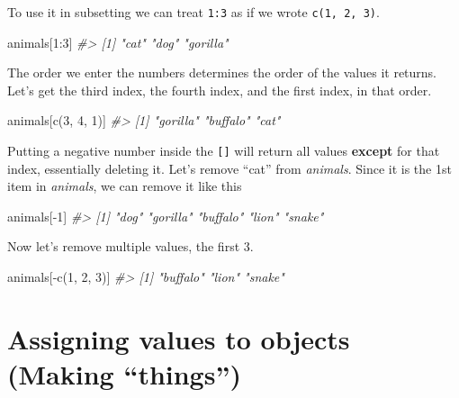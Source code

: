 \documentclass[
]{krantz}
\makeatletter
\newenvironment{Shaded}{\begin{snugshade}}{\end{snugshade}}
\newcommand{\CommentTok}[1]{\textcolor[rgb]{0.37,0.37,0.37}{\textit{#1}}}
\newcommand{\DecValTok}[1]{\textcolor[rgb]{0.06,0.06,0.06}{#1}}
\newcommand{\FunctionTok}[1]{\textcolor[rgb]{0,0,0}{#1}}
\newcommand{\NormalTok}[1]{#1}
\newcommand{\SpecialCharTok}[1]{\textcolor[rgb]{0,0,0}{#1}}
\newenvironment{kframe}{%
\medskip{}
\setlength{\fboxsep}{.8em}
 \def\at@end@of@kframe{}%
 \ifinner\ifhmode%
  \def\at@end@of@kframe{\end{minipage}}%
  \begin{minipage}{\columnwidth}%
 \fi\fi%
 \def\FrameCommand##1{\hskip\@totalleftmargin \hskip-\fboxsep
 \colorbox{shadecolor}{##1}\hskip-\fboxsep
     \hskip-\linewidth \hskip-\@totalleftmargin \hskip\columnwidth}%
 \MakeFramed {\advance\hsize-\width
   \@totalleftmargin\z@ \linewidth\hsize
   \@setminipage}}%
 {\par\unskip\endMakeFramed%
 \at@end@of@kframe}
\renewenvironment{Shaded}{\begin{kframe}}{\end{kframe}}
\makeatother
\begin{document}
To use it in subsetting we can treat \texttt{1:3} as if we wrote \texttt{c(1,\ 2,\ 3)}.

\begin{Shaded}
\begin{Highlighting}[]
\NormalTok{animals[}\DecValTok{1}\SpecialCharTok{:}\DecValTok{3}\NormalTok{]}
\CommentTok{\#\textgreater{} [1] "cat"     "dog"     "gorilla"}
\end{Highlighting}
\end{Shaded}

The order we enter the numbers determines the order of the values it returns. Let's get the third index, the fourth index, and the first index, in that order.

\begin{Shaded}
\begin{Highlighting}[]
\NormalTok{animals[}\FunctionTok{c}\NormalTok{(}\DecValTok{3}\NormalTok{, }\DecValTok{4}\NormalTok{, }\DecValTok{1}\NormalTok{)]}
\CommentTok{\#\textgreater{} [1] "gorilla" "buffalo" "cat"}
\end{Highlighting}
\end{Shaded}

Putting a negative number inside the \texttt{{[}{]}} will return all values \textbf{except} for that index, essentially deleting it. Let's remove ``cat'' from \emph{animals}. Since it is the 1st item in \emph{animals}, we can remove it like this

\begin{Shaded}
\begin{Highlighting}[]
\NormalTok{animals[}\SpecialCharTok{{-}}\DecValTok{1}\NormalTok{]}
\CommentTok{\#\textgreater{} [1] "dog"     "gorilla" "buffalo" "lion"    "snake"}
\end{Highlighting}
\end{Shaded}

Now let's remove multiple values, the first 3.

\begin{Shaded}
\begin{Highlighting}[]
\NormalTok{animals[}\SpecialCharTok{{-}}\FunctionTok{c}\NormalTok{(}\DecValTok{1}\NormalTok{, }\DecValTok{2}\NormalTok{, }\DecValTok{3}\NormalTok{)]}
\CommentTok{\#\textgreater{} [1] "buffalo" "lion"    "snake"}
\end{Highlighting}
\end{Shaded}

\hypertarget{assignment}{%
\section{Assigning values to objects (Making ``things'')}\label{assignment}}
\end{document}

